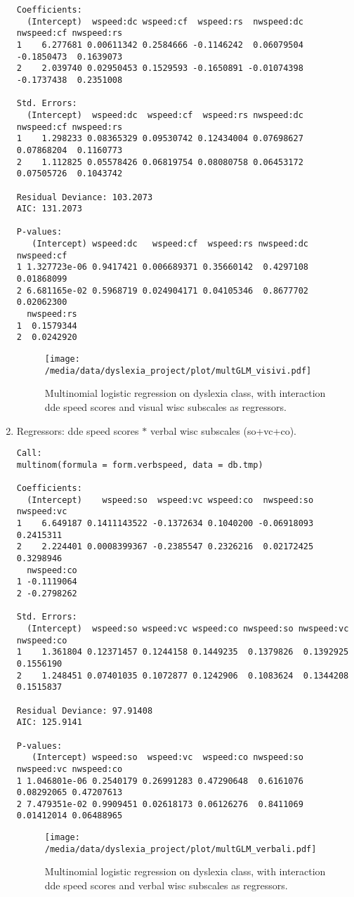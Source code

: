 \documentclass[11pt, a4paper, twoside, openright]{article}
\begin{document}
\begin{enumerate}
\begin{verbatim}
Coefficients:
  (Intercept)  wspeed:dc wspeed:cf  wspeed:rs  nwspeed:dc nwspeed:cf nwspeed:rs
1    6.277681 0.00611342 0.2584666 -0.1146242  0.06079504 -0.1850473  0.1639073
2    2.039740 0.02950453 0.1529593 -0.1650891 -0.01074398 -0.1737438  0.2351008

Std. Errors:
  (Intercept)  wspeed:dc  wspeed:cf  wspeed:rs nwspeed:dc nwspeed:cf nwspeed:rs
1    1.298233 0.08365329 0.09530742 0.12434004 0.07698627 0.07868204  0.1160773
2    1.112825 0.05578426 0.06819754 0.08080758 0.06453172 0.07505726  0.1043742

Residual Deviance: 103.2073 
AIC: 131.2073 

P-values:
   (Intercept) wspeed:dc   wspeed:cf  wspeed:rs nwspeed:dc nwspeed:cf
1 1.327723e-06 0.9417421 0.006689371 0.35660142  0.4297108 0.01868099
2 6.681165e-02 0.5968719 0.024904171 0.04105346  0.8677702 0.02062300
  nwspeed:rs
1  0.1579344
2  0.0242920
\end{verbatim}
\begin{figure}[h!] 
\centering
\texttt{[image: /media/data/dyslexia\_project/plot/multGLM\_visivi.pdf]}
\caption{Multinomial logistic regression on dyslexia class, with
  interaction dde speed scores and visual wisc subscales as regressors.}
\label{fig:21}
\end{figure}

\clearpage

\item Regressors: dde speed scores $*$ verbal wisc subscales (so+vc+co).
\begin{verbatim}
Call:
multinom(formula = form.verbspeed, data = db.tmp)

Coefficients:
  (Intercept)    wspeed:so  wspeed:vc wspeed:co  nwspeed:so nwspeed:vc
1    6.649187 0.1411143522 -0.1372634 0.1040200 -0.06918093  0.2415311
2    2.224401 0.0008399367 -0.2385547 0.2326216  0.02172425  0.3298946
  nwspeed:co
1 -0.1119064
2 -0.2798262

Std. Errors:
  (Intercept)  wspeed:so wspeed:vc wspeed:co nwspeed:so nwspeed:vc nwspeed:co
1    1.361804 0.12371457 0.1244158 0.1449235  0.1379826  0.1392925  0.1556190
2    1.248451 0.07401035 0.1072877 0.1242906  0.1083624  0.1344208  0.1515837

Residual Deviance: 97.91408 
AIC: 125.9141 

P-values:
   (Intercept) wspeed:so  wspeed:vc  wspeed:co nwspeed:so nwspeed:vc nwspeed:co
1 1.046801e-06 0.2540179 0.26991283 0.47290648  0.6161076 0.08292065 0.47207613
2 7.479351e-02 0.9909451 0.02618173 0.06126276  0.8411069 0.01412014 0.06488965
\end{verbatim}
\begin{figure}[h!] 
\centering
\texttt{[image: /media/data/dyslexia\_project/plot/multGLM\_verbali.pdf]}
\caption{Multinomial logistic regression on dyslexia class, with
  interaction dde speed scores and verbal wisc subscales as regressors.}
\label{fig:22}
\end{figure}


\end{enumerate}
\end{document}

